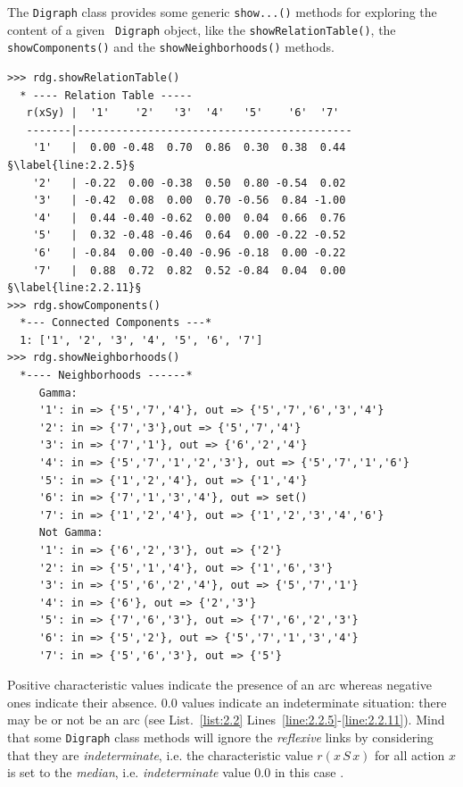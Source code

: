 The \texttt{Digraph} class provides some generic \texttt{show...()} methods for exploring the content of a given \texttt{ Digraph} object, like the \texttt{showRelationTable()}, the \texttt{showComponents()} and the \texttt{showNeighborhoods()} methods.
\begin{lstlisting}[caption={Example of random valuation digraph},label=list:2.2]
>>> rdg.showRelationTable()
  * ---- Relation Table -----
   r(xSy) |  '1'    '2'   '3'  '4'   '5'    '6'  '7'	  
   -------|-------------------------------------------
    '1'   |  0.00 -0.48  0.70  0.86  0.30  0.38  0.44 §\label{line:2.2.5}§	 
    '2'   | -0.22  0.00 -0.38  0.50  0.80 -0.54  0.02	 
    '3'   | -0.42  0.08  0.00  0.70 -0.56  0.84 -1.00	 
    '4'   |  0.44 -0.40 -0.62  0.00  0.04  0.66  0.76	 
    '5'   |  0.32 -0.48 -0.46  0.64  0.00 -0.22 -0.52	 
    '6'   | -0.84  0.00 -0.40 -0.96 -0.18  0.00 -0.22	 
    '7'   |  0.88  0.72  0.82  0.52 -0.84  0.04  0.00 §\label{line:2.2.11}§
>>> rdg.showComponents()
  *--- Connected Components ---*
  1: ['1', '2', '3', '4', '5', '6', '7']
>>> rdg.showNeighborhoods()
  *---- Neighborhoods ------*
     Gamma:
     '1': in => {'5','7','4'}, out => {'5','7','6','3','4'}
     '2': in => {'7','3'},out => {'5','7','4'}
     '3': in => {'7','1'}, out => {'6','2','4'}
     '4': in => {'5','7','1','2','3'}, out => {'5','7','1','6'}
     '5': in => {'1','2','4'}, out => {'1','4'}
     '6': in => {'7','1','3','4'}, out => set()
     '7': in => {'1','2','4'}, out => {'1','2','3','4','6'}
     Not Gamma:
     '1': in => {'6','2','3'}, out => {'2'}
     '2': in => {'5','1','4'}, out => {'1','6','3'}
     '3': in => {'5','6','2','4'}, out => {'5','7','1'}
     '4': in => {'6'}, out => {'2','3'}
     '5': in => {'7','6','3'}, out => {'7','6','2','3'}
     '6': in => {'5','2'}, out => {'5','7','1','3','4'}
     '7': in => {'5','6','3'}, out => {'5'}
\end{lstlisting}   

Positive characteristic values indicate the presence of an arc whereas negative ones indicate their absence. $0.0$ values indicate an indeterminate situation: there may be or not be an arc (see List.~\vref{list:2.2} Lines~\ref{line:2.2.5}-\ref{line:2.2.11}). Mind that some \texttt{Digraph} class methods will ignore the \emph{reflexive} links by considering that they are \emph{indeterminate}, i.e. the characteristic value $r(x\,S\,x)$ for all action $x$ is set to the \emph{median}, i.e. \emph{indeterminate} value $0.0$ in this case \citep{BIS-2004a}.

